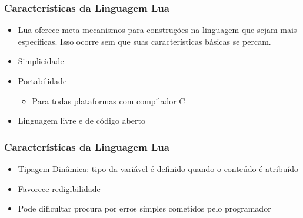\documentclass{beamer}
\begin{document}
\begin{frame}
    \frametitle{Características da Linguagem Lua}
    \begin{itemize}
        \item Lua oferece meta-mecanismos para construções na linguagem que sejam mais específicas. Isso ocorre sem que suas características básicas se percam.
        \item Simplicidade
        \item Portabilidade
            \begin{itemize}
                \item Para todas plataformas com compilador C
            \end{itemize}    
        \item Linguagem livre e de código aberto
    \end{itemize}
\end{frame}

\begin{frame}
    \frametitle{Características da Linguagem Lua}
    \begin{itemize}
        \item Tipagem Dinâmica: tipo da variável é definido quando o conteúdo é atribuído
         \item Favorece redigibilidade
         \item Pode dificultar procura por erros simples cometidos pelo programador
    \end{itemize}
\end{frame}
\end{document}
